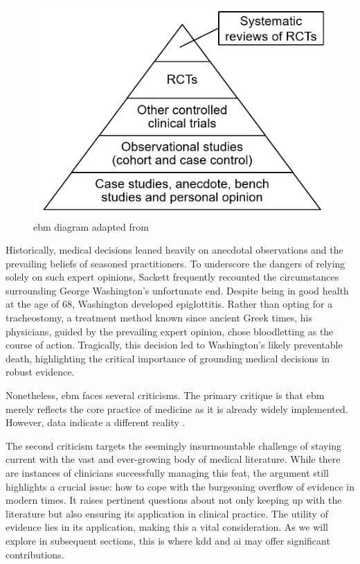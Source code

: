 \begin{figure}
    \centering
    \includegraphics[scale=0.55]{figures/ebm.png}
    
    \caption{\acl{ebm} diagram adapted from \cite{greenhalghHowReadPaper2019}} \label{fig:ebm}
    \end{figure}

Historically, medical decisions leaned heavily on anecdotal observations and the prevailing beliefs of seasoned practitioners. To underscore the dangers of relying solely on such expert opinions, Sackett frequently recounted the circumstances surrounding George Washington's unfortunate end. Despite being in good health at the age of 68, Washington developed epiglottitis. Rather than opting for a tracheostomy, a treatment method known since ancient Greek times, his physicians, guided by the prevailing expert opinion, chose bloodletting as the course of action. Tragically, this decision led to Washington's likely preventable death, highlighting the critical importance of grounding medical decisions in robust evidence.

Nonetheless, \ac{ebm} faces several criticisms. The primary critique is that \ac{ebm} merely reflects the core practice of medicine as it is already widely implemented. However, data indicate a different reality \cite{sackettEvidenceBasedMedicine1996}.
    
The second criticism targets the seemingly insurmountable challenge of staying current with the vast and ever-growing body of medical literature. While there are instances of clinicians successfully managing this feat, the argument still highlights a crucial issue: how to cope with the burgeoning overflow of evidence in modern times. It raises pertinent questions about not only keeping up with the literature but also ensuring its application in clinical practice. The utility of evidence lies in its application, making this a vital consideration. As we will explore in subsequent sections, this is where \ac{kdd} and \ac{ai} may offer significant contributions.
    
